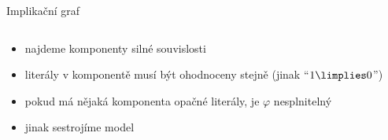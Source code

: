\documentclass{beamer}
\begin{document}
\begin{frame}{Implikační graf}
\begin{columns}
        \begin{column}{0.45\textwidth}
        
        \begin{itemize}[<+->]
            \item najdeme komponenty silné souvislosti
            \item literály v komponentě musí být ohodnoceny stejně (jinak ``$1\limplies 0$'')
            \item pokud má nějaká komponenta opačné literály, je $\varphi$ nesplnitelný
            \item jinak sestrojíme model
        \end{itemize}
        
        \end{column}
         
    \end{columns}

\end{frame}
\end{document}
